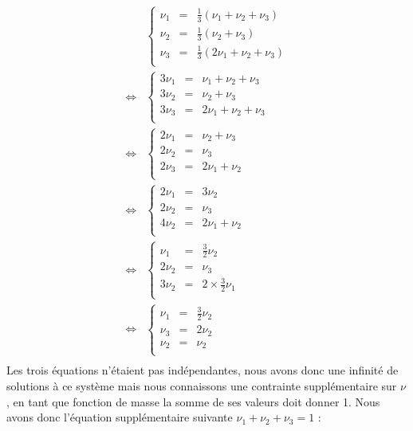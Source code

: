 \documentclass[10pt,a4paper,twoside]{article}
\begin{document}
\begin{align*}
& \left\lbrace \begin{array}{rcl}
\nu_{1} &=& \frac{1}{3}(\nu_{1}+\nu_{2}+\nu_{3})\\
\nu_{2} &=& \frac{1}{3}(\nu_{2}+\nu_{3})\\
\nu_{3} &=& \frac{1}{3}(2\nu_{1}+\nu_{2}+\nu_{3})\\
\end{array}\right.\\
\Leftrightarrow & \left\lbrace \begin{array}{rcl}
3\nu_{1} &=& \nu_{1}+\nu_{2}+\nu_{3}\\
3\nu_{2} &=& \nu_{2}+\nu_{3}\\
3\nu_{3} &=& 2\nu_{1}+\nu_{2}+\nu_{3}\\
\end{array}\right.\\
\Leftrightarrow & \left\lbrace \begin{array}{rcl}
2\nu_{1} &=& \nu_{2}+\nu_{3}\\
2\nu_{2} &=& \nu_{3}\\
2\nu_{3} &=& 2\nu_{1}+\nu_{2}\\
\end{array}\right.\\
\Leftrightarrow & \left\lbrace \begin{array}{rcl}
2\nu_{1} &=& 3\nu_{2}\\
2\nu_{2} &=& \nu_{3}\\
4\nu_{2} &=& 2\nu_{1}+\nu_{2}\\
\end{array}\right.\\
\Leftrightarrow & \left\lbrace \begin{array}{rcl}
\nu_{1} &=& \frac{3}{2}\nu_{2}\\
2\nu_{2} &=& \nu_{3}\\
3\nu_{2} &=& 2\times\frac{3}{2}\nu_{1}\\
\end{array}\right.\\
\Leftrightarrow & \left\lbrace \begin{array}{rcl}
\nu_{1} &=& \frac{3}{2}\nu_{2}\\
\nu_{3} &=& 2\nu_{2}\\
\nu_{2} &=& \nu_{2}\\
\end{array}\right.\\
\end{align*}
Les trois équations n'étaient pas indépendantes, nous avons donc une infinité de solutions à ce système mais nous connaissons une contrainte supplémentaire sur $\nu$, en tant que fonction de masse la somme de ses valeurs doit donner 1. Nous avons donc l'équation supplémentaire suivante $\nu_{1}+\nu_{2}+\nu_{3}=1$ :
\end{document}
